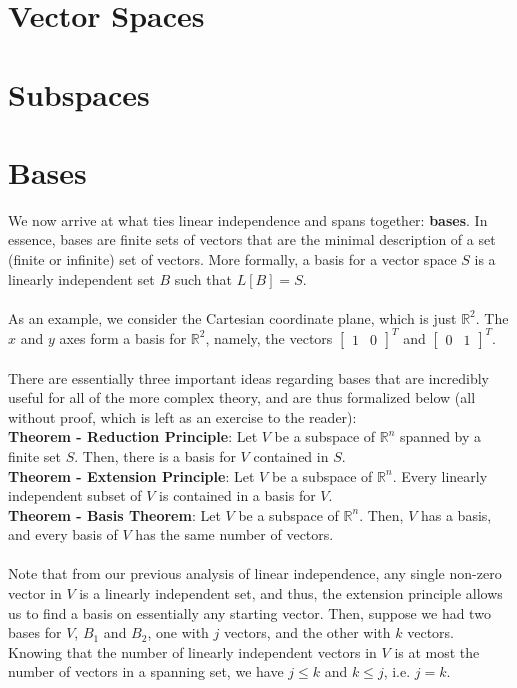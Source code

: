 \documentclass[11pt]{report}
\newcommand{\R}{\mathbb{R}}
\begin{document}
\section{Vector Spaces}

\section{Subspaces}

\section{Bases}
We now arrive at what ties linear independence and spans together: \textbf{bases}. In essence, bases are finite sets of vectors that are the minimal description of a set (finite or infinite) set of vectors.  More formally, a basis for a vector space $S$ is a linearly independent set $B$ such that $L[B] = S$. 
\\ \\
As an example, we consider the Cartesian coordinate plane, which is just $\R^2$. The $x$ and $y$ axes form a basis for $\R^2$, namely, the vectors $\begin{bmatrix} 1 & 0 \end{bmatrix}^T$ and $\begin{bmatrix} 0 & 1 \end{bmatrix}^T$.
\\ \\
There are essentially three important ideas regarding bases that are incredibly useful for all of the more complex theory, and are thus formalized below (all without proof, which is left as an exercise to the reader):
\\
\textbf{Theorem - Reduction Principle}: Let $V$ be a subspace of $\R^n$ spanned by a finite set $S$. Then, there is a basis for $V$ contained in $S$.
\\
\textbf{Theorem - Extension Principle}: Let $V$ be a subspace of $\R^n$. Every linearly independent subset of $V$ is contained in a basis for $V$.
\\
\textbf{Theorem - Basis Theorem}: Let $V$ be a subspace of $\R^n$. Then, $V$ has a basis, and every basis of $V$ has the same number of vectors.
\\ \\
Note that from our previous analysis of linear independence, any single non-zero vector in $V$ is a linearly independent set, and thus, the extension principle allows us to find a basis on essentially any starting vector. Then, suppose we had two bases for $V$, $B_1$ and $B_2$, one with $j$ vectors, and the other with $k$ vectors. Knowing that the number of linearly independent vectors in $V$ is at most the number of vectors in a spanning set, we have $j \le k$ and $k \le j$, i.e. $j = k$.
\end{document}
